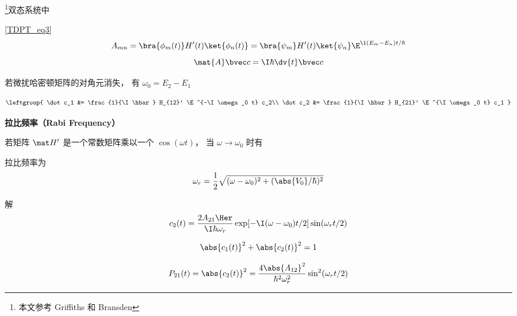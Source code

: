 
\footnote{本文参考 Griffiths 和 Bransden}双态系统中

\autoref{TDPT_eq3}~
\begin{equation}
A_{mn} = \bra{\phi_m(t)} H'(t) \ket{\phi_n(t)} = \bra{\psi_m} H'(t) \ket{\psi_n} \E^{\I(E_m-E_n)t/\hbar}
\end{equation}
\begin{equation}
\mat {A} \bvec c = \I\hbar \dv{t} \bvec c
\end{equation}

若微扰哈密顿矩阵的对角元消失， 有 $\omega_0 = E_2 - E_1$


\begin{equation}
\leftgroup{
\dot c_1 &= \frac{1}{\I \hbar} H_{12}' \E^{-\I\omega_0 t} c_2\\
\dot c_2 &= \frac{1}{\I \hbar} H_{21}' \E^{\I\omega_0 t} c_1
}\end{equation}

\textbf{拉比频率（Rabi Frequency）}

若矩阵 $\mat H'$ 是一个常数矩阵乘以一个 $\cos(\omega t)$， 当 $\omega \to \omega_0$ 时有


拉比频率为
\begin{equation}
\omega_r = \frac{1}{2} \sqrt{(\omega - \omega_0)^2 + (\abs{V_0}/\hbar)^2}
\end{equation}

解
\begin{equation}
c_2(t) = \frac{2A_{21}\Her}{\I \hbar \omega_r} \exp[-\I (\omega - \omega_0) t / 2] \sin(\omega_r t/2)
\end{equation}


\begin{equation}
\abs{c_1(t)}^2 + \abs{c_2(t)}^2 = 1
\end{equation}

\begin{equation}
P_{21}(t) = \abs{c_2(t)}^2 = \frac{4\abs{A_{12}}^2}{\hbar^2 \omega_r^2} \sin^2(\omega_r t/2)
\end{equation}
